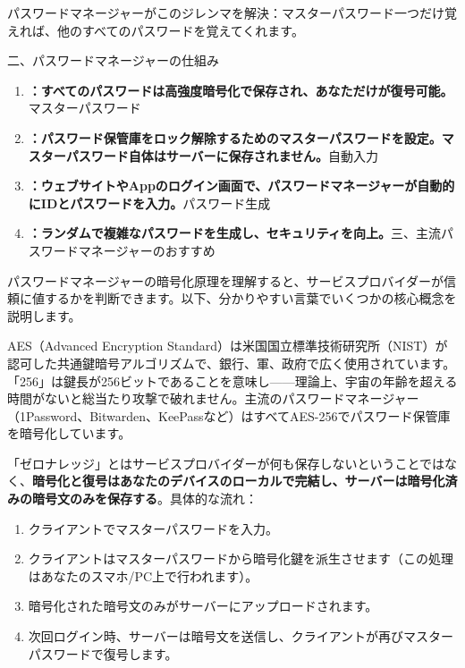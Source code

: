 


パスワードマネージャーがこのジレンマを解決：マスターパスワード一つだけ覚えれば、他のすべてのパスワードを覚えてくれます。

二、パスワードマネージャーの仕組み


\begin{enumerate}
  \item \textbf{：すべてのパスワードは高強度暗号化で保存され、あなただけが復号可能。}マスターパスワード
  \item \textbf{：パスワード保管庫をロック解除するためのマスターパスワードを設定。マスターパスワード自体はサーバーに保存されません。}自動入力
  \item \textbf{：ウェブサイトやAppのログイン画面で、パスワードマネージャーが自動的にIDとパスワードを入力。}パスワード生成
  \item \textbf{：ランダムで複雑なパスワードを生成し、セキュリティを向上。}三、主流パスワードマネージャーのおすすめ
\end{enumerate}


パスワードマネージャーの暗号化原理を理解すると、サービスプロバイダーが信頼に値するかを判断できます。以下、分かりやすい言葉でいくつかの核心概念を説明します。


AES（Advanced Encryption Standard）は米国国立標準技術研究所（NIST）が認可した共通鍵暗号アルゴリズムで、銀行、軍、政府で広く使用されています。「256」は鍵長が256ビットであることを意味し——理論上、宇宙の年齢を超える時間がないと総当たり攻撃で破れません。主流のパスワードマネージャー（1Password、Bitwarden、KeePassなど）はすべてAES-256でパスワード保管庫を暗号化しています。


「ゼロナレッジ」とはサービスプロバイダーが何も保存しないということではなく、\textbf{暗号化と復号はあなたのデバイスのローカルで完結し、サーバーは暗号化済みの暗号文のみを保存する}。具体的な流れ：

\begin{enumerate}
  \item クライアントでマスターパスワードを入力。
  \item クライアントはマスターパスワードから暗号化鍵を派生させます（この処理はあなたのスマホ/PC上で行われます）。
  \item 暗号化された暗号文のみがサーバーにアップロードされます。
  \item 次回ログイン時、サーバーは暗号文を送信し、クライアントが再びマスターパスワードで復号します。
\end{enumerate}

